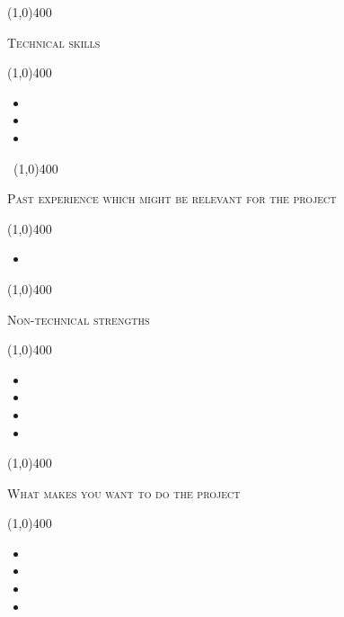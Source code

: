 \documentclass[12pt,a4paper]{report}
\begin{document}
	\begin{center}
	
	\line(1,0){400}\\
	{\scshape\large Technical skills\par}
	\line(1,0){400}\\
	\end{center}
		\begin{itemize}
\item 
\item 
\item  
\end{itemize}
\newpage
\begin{center}
	\vspace*{-3cm}\
	\line(1,0){400}\\
	{\scshape\large Past experience which might be relevant for the project\par}
	\line(1,0){400}\\
	\end{center}
		\begin{itemize}
\item 

\end{itemize}

	\begin{center}
	
	\line(1,0){400}\\
	{\scshape\large Non-technical strengths\par}
	\line(1,0){400}\\
	\end{center}
		\begin{itemize}
\item 
\item 
\item 
\item 
\end{itemize}

\begin{center}
	
	\line(1,0){400}\\
	{\scshape\large What makes you want to do the project\par}
	\line(1,0){400}\\
	\end{center}
		\begin{itemize}
\item 
\item 
\item 
\item 
\end{itemize}
\end{document}
